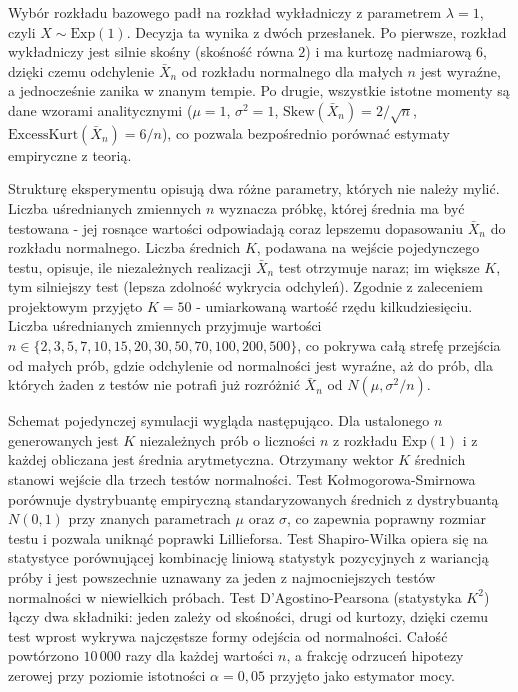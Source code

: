 \documentclass[12pt,a4paper]{article}
\begin{document}
Wybór rozkładu bazowego padł na rozkład wykładniczy z parametrem $\lambda = 1$, czyli $X \sim \mathrm{Exp}(1)$. Decyzja ta wynika z dwóch przesłanek. Po pierwsze, rozkład wykładniczy jest silnie skośny (skośność równa $2$) i ma kurtozę nadmiarową $6$, dzięki czemu odchylenie $\bar{X}_n$ od rozkładu normalnego dla małych $n$ jest wyraźne, a jednocześnie zanika w znanym tempie. Po drugie, wszystkie istotne momenty są dane wzorami analitycznymi ($\mu = 1$, $\sigma^2 = 1$, $\mathrm{Skew}(\bar{X}_n) = 2/\sqrt{n}$, $\mathrm{ExcessKurt}(\bar{X}_n) = 6/n$), co pozwala bezpośrednio porównać estymaty empiryczne z teorią.

Strukturę eksperymentu opisują dwa różne parametry, których nie należy mylić. Liczba uśrednianych zmiennych $n$ wyznacza próbkę, której średnia ma być testowana - jej rosnące wartości odpowiadają coraz lepszemu dopasowaniu $\bar{X}_n$ do rozkładu normalnego. Liczba średnich $K$, podawana na wejście pojedynczego testu, opisuje, ile niezależnych realizacji $\bar{X}_n$ test otrzymuje naraz; im większe $K$, tym silniejszy test (lepsza zdolność wykrycia odchyleń). Zgodnie z zaleceniem projektowym przyjęto $K = 50$ - umiarkowaną wartość rzędu kilkudziesięciu. Liczba uśrednianych zmiennych przyjmuje wartości $n \in \{2, 3, 5, 7, 10, 15, 20, 30, 50, 70, 100, 200, 500\}$, co pokrywa całą strefę przejścia od małych prób, gdzie odchylenie od normalności jest wyraźne, aż do prób, dla których żaden z testów nie potrafi już rozróżnić $\bar{X}_n$ od $N(\mu, \sigma^2/n)$.

Schemat pojedynczej symulacji wygląda następująco. Dla ustalonego $n$ generowanych jest $K$ niezależnych prób o liczności $n$ z rozkładu $\mathrm{Exp}(1)$ i z każdej obliczana jest średnia arytmetyczna. Otrzymany wektor $K$ średnich stanowi wejście dla trzech testów normalności. Test Kołmogorowa-Smirnowa porównuje dystrybuantę empiryczną standaryzowanych średnich z dystrybuantą $N(0,1)$ przy znanych parametrach $\mu$ oraz $\sigma$, co zapewnia poprawny rozmiar testu i pozwala uniknąć poprawki Lillieforsa. Test Shapiro-Wilka opiera się na statystyce porównującej kombinację liniową statystyk pozycyjnych z wariancją próby i jest powszechnie uznawany za jeden z najmocniejszych testów normalności w niewielkich próbach. Test D'Agostino-Pearsona (statystyka $K^2$) łączy dwa składniki: jeden zależy od skośności, drugi od kurtozy, dzięki czemu test wprost wykrywa najczęstsze formy odejścia od normalności. Całość powtórzono $10\,000$ razy dla każdej wartości $n$, a frakcję odrzuceń hipotezy zerowej przy poziomie istotności $\alpha = 0{,}05$ przyjęto jako estymator mocy.
\end{document}
